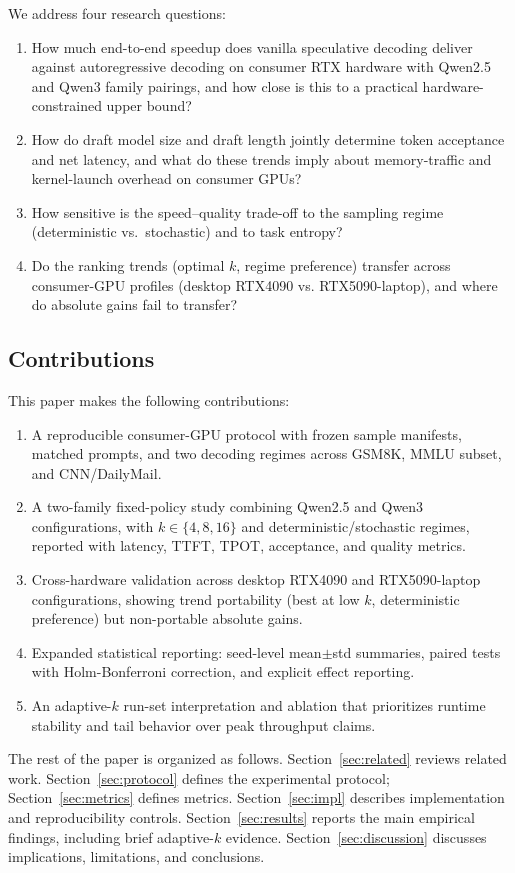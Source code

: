 We address four research questions:
\begin{enumerate}\itemsep0pt
  \item[\textbf{RQ1.}] How much end-to-end speedup does vanilla
        speculative decoding deliver against autoregressive decoding on
      consumer RTX hardware with Qwen2.5 and Qwen3 family pairings, and how
      close is this to
        a practical hardware-constrained upper bound?
  \item[\textbf{RQ2.}] How do draft model size and draft length jointly
        determine token acceptance and net latency, and what do these trends
        imply about memory-traffic and kernel-launch overhead on consumer GPUs?
  \item[\textbf{RQ3.}] How sensitive is the speed--quality trade-off to
        the sampling regime (deterministic vs.\ stochastic) and to task
        entropy?
  \item[\textbf{RQ4.}] Do the ranking trends (optimal $k$, regime preference)
        transfer across consumer-GPU profiles (desktop RTX4090 vs.
        RTX5090-laptop), and where do absolute gains fail to transfer?
\end{enumerate}

\subsection{Contributions}
\label{sec:contributions}

This paper makes the following contributions:
\begin{enumerate}\itemsep0pt
  \item A reproducible consumer-GPU protocol with frozen sample manifests,
        matched prompts, and two decoding regimes across GSM8K, MMLU subset,
        and CNN/DailyMail.
  \item A two-family fixed-policy study combining Qwen2.5 and Qwen3
        configurations, with $k\in\{4,8,16\}$ and
        deterministic/stochastic regimes, reported with latency, TTFT, TPOT,
        acceptance, and quality metrics.
  \item Cross-hardware validation across desktop RTX4090 and RTX5090-laptop
        configurations, showing trend portability (best at low $k$,
        deterministic preference) but non-portable absolute gains.
  \item Expanded statistical reporting: seed-level
        mean$\pm$std summaries, paired tests with Holm-Bonferroni correction,
        and explicit effect reporting.
  \item An adaptive-$k$ run-set interpretation and ablation that prioritizes runtime
        stability and tail behavior over peak throughput claims.
\end{enumerate}

The rest of the paper is organized as follows. Section~\ref{sec:related}
reviews related work. Section~\ref{sec:protocol} defines the experimental
protocol; Section~\ref{sec:metrics} defines metrics. Section~\ref{sec:impl}
describes implementation and reproducibility controls. Section~\ref{sec:results}
reports the main empirical findings, including brief adaptive-$k$
evidence. Section~\ref{sec:discussion}
discusses implications, limitations, and conclusions.
